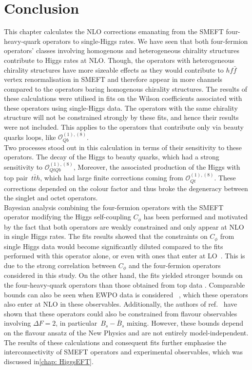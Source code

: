 	\section{Conclusion \label{sec:conclusion4tops}}
	This chapter calculates the NLO corrections emanating from the SMEFT four-heavy-quark operators to single-Higgs rates. We have seen that both four-fermion operators' classes involving homogenous and heterogeneous chirality structures contribute to Higgs rates at NLO. Though, the operators with heterogeneous chirality structures have more sizeable effects as they would contribute to $h f\bar f$ vertex renormalisation in SMEFT and therefore appear in more channels compared to the operators baring homogenous chirality structures. The results of these calculations were utilised in fits on the Wilson coefficients associated with these operators using single-Higgs data. The operators with the same chirality structure will not be constrained strongly by these fits, and hence their results were not included. This applies to the operators that contribute only via beauty quarks loops, like $\mathcal{O}_{Qb}^{(1),(8)}$. \\ Two processes stood out in this calculation in terms of their sensitivity to these operators. The decay of the Higgs to beauty quarks, which had a strong sensitivity to $\mathcal{O}_{QtQb}^{(1),(8)}$, Moreover, the associated production of the Higgs with top pair~$t \bar th$, which had large finite corrections coming from $\mathcal{O}_{Qt}^{(1),(8)}$. These corrections depended on the colour factor and thus broke the degeneracy between the singlet and octet operators. \\
	Bayesian analysis combining the four-fermion operators with the SMEFT operator modifying the Higgs self-coupling $C_\phi$ has been performed and motivated by the fact that both operators are weakly constrained and only appear at NLO in single Higgs rates. The fits results showed that the constraints on $C_\phi$ from single Higgs data would become significantly diluted compared to the fits performed with this operator alone, or even with ones that enter at LO~\cite{Gorbahn:2016uoy, Degrassi:2016wml, Bizon:2016wgr, Maltoni:2017ims, Degrassi:2021uik}. This is due to the strong correlation between $C_\phi$ and the four-fermion operators considered in this study. On the other hand, the fits yielded stronger bounds on the four-heavy-quark operators than those obtained from top data \cite{Ethier:2021bye, Hartland:2019bjb}. Comparable bounds can also be seen when EWPO data is considered ~\cite{Dawson:2022bxd}, which these operators also enter at NLO in these observables. Additionally, the authors of ref.~\cite{Silvestrini:2018dos} have shown that these operators could also be constrained from flavour observables involving $\Delta F=2$, in particular~$B_s -\bar{B}_s$ mixing. However, these bounds depend on the flavour ansatz of the New Physics and are not entirely model-independent. \\ The results of these calculations and consequent fits further emphasise the interconnectivity of SMEFT operators and experimental observables, which was discussed in\autoref{chap: HiggsEFT}. \\
